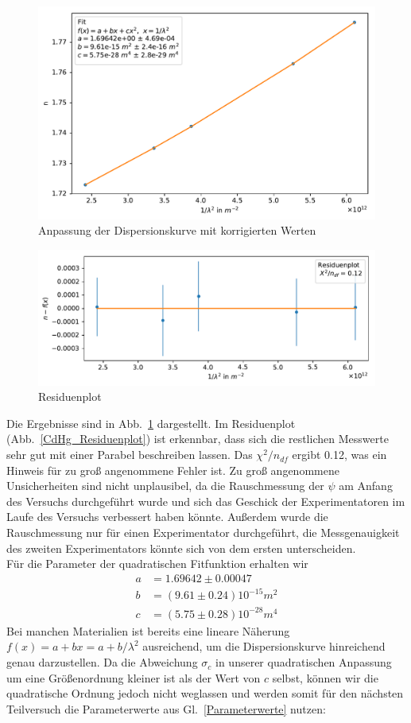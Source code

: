 \documentclass[12pt,a4paper]{article}
\begin{document}
\begin{figure}[H]
	\centering
	\includegraphics[width=0.7\linewidth]{Python/CdHg_Fit.pdf}
	\caption{Anpassung der Dispersionskurve mit korrigierten Werten}
	\label{CdHg_LinReg}
\end{figure}
\begin{figure}[H]
	\centering
	\includegraphics[width=0.7\linewidth]{Python/CdHg_Residuen.pdf}
	\caption{Residuenplot}
	\label{CdHg_Residuenplot}
\end{figure}
Die Ergebnisse sind in Abb.~\ref{CdHg_LinReg} dargestellt. Im Residuenplot (Abb.~\eqref{CdHg_Residuenplot}) ist erkennbar, dass sich die restlichen Messwerte sehr gut mit einer Parabel beschreiben lassen. Das $\chi^2/n_{df}$ ergibt 0.12, was ein Hinweis für zu groß angenommene Fehler ist. Zu groß angenommene Unsicherheiten sind nicht unplausibel, da die Rauschmessung der $\psi$ am Anfang des Versuchs durchgeführt wurde und sich das Geschick der Experimentatoren im Laufe des Versuchs verbessert haben könnte. Außerdem wurde die Rauschmessung nur für einen Experimentator durchgeführt, die Messgenauigkeit des zweiten Experimentators könnte sich von dem ersten unterscheiden.\\
Für die Parameter der quadratischen Fitfunktion erhalten wir
\begin{align}\label{Parameterwerte}
a&=1.69642\pm0.00047\\
b&=(9.61\pm0.24)10^{-15}m^2\nonumber\\
c&=(5.75\pm0.28)10^{-28}m^4\nonumber
\end{align}
Bei manchen Materialien ist bereits eine lineare Näherung $f(x)=a+bx=a+b/\lambda^2$ ausreichend, um die Dispersionskurve hinreichend genau darzustellen. Da die Abweichung $\sigma_c$ in unserer quadratischen Anpassung um eine Größenordnung kleiner ist als der Wert von $c$ selbst, können wir die quadratische Ordnung jedoch nicht weglassen und werden somit für den nächsten Teilversuch die Parameterwerte aus Gl.~\eqref{Parameterwerte} nutzen:
\end{document}
